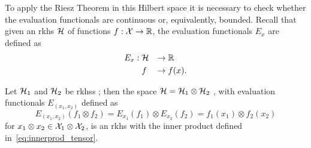 To apply the Riesz Theorem in this Hilbert space it is necessary to check whether the evaluation functionals are continuous or, equivalently, bounded.
Recall that given an \acrshort{rkhs} $\mathcal{H}$ of functions $f: \mathcal{X} \to \mathbb{R}$, the evaluation functionals $E_{x}$ are defined as
\begin{equation}
    \nonumber
    \begin{aligned}
        E_x :\; & \mathcal{H} &\to & \; \mathbb{R} \\
          & f     &\to & \; f(x) .
    \end{aligned}
\end{equation} 
%
\begin{proposition}\label{prop:bounded_tensorfun}
    Let $\mathcal{H}_1$ and $\mathcal{H}_2$ be \acrshort{rkhss} ; then
    the space $\mathcal{H} = \mathcal{H}_1 \otimes \mathcal{H}_2$ , with evaluation functionals $E_{(x_1, x_2)} $ defined as
    $$E_{(x_1, x_2)} (f_1 \otimes f_2) =E_{x_1}(f_1) \otimes E_{x_2}(f_2) = f_1(x_1) \otimes f_2(x_2)$$
    for $x_1 \otimes x_2 \in \mathcal{X}_1 \otimes \mathcal{X}_2$,
    is an \acrshort{rkhs} with the inner product defined in~\eqref{eq:innerprod_tensor}.
\end{proposition}
